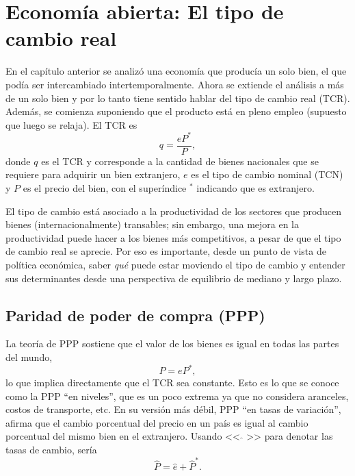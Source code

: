 \documentclass[DeGregorioResumen]{subfiles}
\begin{document}
\section{Economía abierta: El tipo de cambio real}

En el capítulo anterior se analizó una economía que producía un solo bien, el que podía ser intercambiado intertemporalmente. Ahora se extiende el análisis a más de un solo bien y por lo tanto tiene sentido hablar del tipo de cambio real (TCR). Además, se comienza suponiendo que el producto está en pleno empleo (supuesto que luego se relaja). El TCR es
\begin{equation}
q=\frac{eP^*}{P},
\end{equation}
donde $q$ es el TCR y corresponde a la cantidad de bienes nacionales que se requiere para adquirir un bien extranjero, $e$ es el tipo de cambio nominal (TCN) y $P$ es el precio del bien, con el superíndice $^*$ indicando que es extranjero.
 
El tipo de cambio está asociado a la productividad de los sectores que producen bienes (internacionalmente) transables; sin embargo, una mejora en la productividad puede hacer a los bienes más competitivos, a pesar de que el tipo de cambio real se aprecie. Por eso es importante, desde un punto de vista de política económica, saber \emph{qué} puede estar moviendo el tipo de cambio y entender sus determinantes desde una perspectiva de equilibrio de mediano y largo plazo.

\subsection{Paridad de poder de compra (PPP)}

La teoría de PPP sostiene que el valor de los bienes es igual en todas las partes del mundo,
\begin{equation}
	P=eP^*,
\end{equation}
lo que implica directamente que el TCR sea constante. Esto es lo que se conoce como la PPP ``en niveles'', que es un poco extrema ya que no considera aranceles, costos de transporte, etc. En su versión más débil, PPP ``en tasas de variación'', afirma que el cambio porcentual del precio en un país es igual al cambio porcentual del mismo bien en el extranjero. Usando << $\hat{}$ >> para denotar las tasas de cambio, sería
\begin{equation}
	\hat P = \hat e + \hat P^*.
\end{equation}
\end{document}
